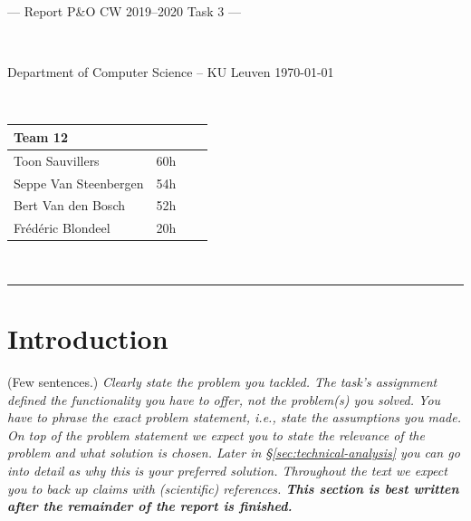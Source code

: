 \documentclass[a4paper,11pt]{article}
\newcommand{\note}[1]{{\colorbox{yellow!40!white}{#1}}}
\newcommand{\exampletext}[1]{{\color{blue!60!black}#1}}
\begin{document}
\noindent
\colorbox[HTML]{52BDEC}{\bfseries\parbox{\textwidth}{\centering\large
  --- Report P\&O CW 2019--2020 Task 3 ---
}}
\\[-1mm]
\colorbox[HTML]{00407A}{\bfseries\color{white}\parbox{\textwidth}{
  Department of Computer Science -- KU Leuven
  \hfill
  \today
}}
\\

\smallskip

\noindent
\begin{tabular}{*4l}
\toprule
\multicolumn{2}{l}{\large\textbf{Team 12}} \\
\midrule
Toon Sauvillers & 60h \\ %
Seppe Van Steenbergen & 54h \\
Bert Van den Bosch & 52h \\
Frédéric Blondeel & 20h \\
\bottomrule
\hline
\end{tabular}\\

\noindent
{\color[HTML]{52BDEC} \rule{\linewidth}{1mm} }

\section{Introduction}\label{sec:introduction}

\note{(Few sentences.)}
\exampletext{
\textit{Clearly state the problem you tackled. The task's assignment defined the functionality you have to offer, not the problem(s) you solved. You have to phrase the exact problem statement, i.e., state the assumptions you made. On top of the problem statement we expect you to state the relevance of the problem and what solution is chosen. Later in \S\ref{sec:technical-analysis} you can go into detail as why this is your preferred solution. Throughout the text we expect you to back up claims with (scientific) references.
\textbf{This section is best written after the remainder of the report is finished.}}}
\end{document}
